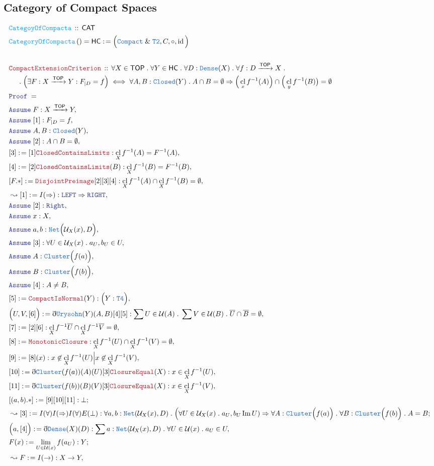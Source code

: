 \documentclass[12pt]{scrartcl}
\newcommand{\TYPE}[1]{\textcolor{NavyBlue}{\mathtt{#1}}}
\newcommand{\FUNC}[1]{\textcolor{Cerulean}{\mathtt{#1}}}
\newcommand{\LOGIC}[1]{\textcolor{Blue}{\mathtt{#1}}}
\newcommand{\THM}[1]{\textcolor{Maroon}{\mathtt{#1}}}
\renewcommand{\.}{\; . \;}
\newcommand{\de}{: \kern 0.1pc =}
\newcommand{\Act}[1]{\left( #1 \right)}
\newcommand{\Theorem}[2]{& \THM{#1} \, :: \, #2 \\ & \Proof = \\ }
\newcommand{\DeclareFunc}[2]{& \FUNC{#1} \, :: \, #2 \\}
\newcommand{\DefineNamedFunc}[4]{&  \FUNC{#1}\Act{#2} = #3 \de #4 \\}
\newcommand{\NewLine}{\\ & \kern 1pc}
\newcommand{\Page}[1]{ \begin{align*} #1 \end{align*}   }
\newcommand{ \bd }{ \ByDef }
\renewcommand{\And}{\; \& \;}
\newcommand{\Imply}{\Rightarrow}
\DeclareMathOperator*{\id}{id}
\DeclareMathOperator*{\im}{Im}
\newcommand{\Arrow}{\xrightarrow}
\newcommand{\Say}[3]{& #1 \de #2 : #3, \\}
\newcommand{\Conclude}[3]{& #1 \de #2 : #3; \\}
\newcommand{\Derive}[3]{& \leadsto #1 \de #2 : #3, \\}
\newcommand{\DeriveConclude}[3]{& \leadsto #1 \de #2 : #3 ; \\}
\newcommand{\Assume}[2]{& \LOGIC{Assume} \; #1 : #2, \\}
\newcommand{\ByDef}{\eth}
\newcommand{\Proof}{\LOGIC{Proof} \; }
\newcommand{\CAT}{\mathsf{CAT}}
\DeclareMathOperator*{\cl}{cl}
\newcommand{\TOP}{\mathsf{TOP}}
\newcommand{\HC}{\mathsf{HC}}
\newcommand{\U}{\mathcal{U}}
\begin{document}
\subsection{Category of Compact Spaces}
\Page{
	\DeclareFunc{CategoyOfCompacta}{\CAT}
	\DefineNamedFunc{CategoryOfCompacta}{}{\HC}{ \Big( \TYPE{Compact} \And \TYPE{T2}, C, \circ, \id \Big)  } 
	\\
	\Theorem{CompactExtensionCriterion}
	{
		\forall X \in \TOP \.
		\forall Y \in \HC \. 
		\forall D : \TYPE{Dense}(X) \.
		\forall f : D \Arrow{\TOP} X \.
		\NewLine \. 
		\Big(\exists F : X \Arrow{\TOP} Y  : F_{|D} = f \Big)    
		\iff
		\forall A,B : \TYPE{Closed}(Y) \.  
		A \cap B= \emptyset \Imply
		\Big(\cl_x f^{-1}(A)\Big) \cap \Big( \cl_y f^{-1}(B) \big) = \emptyset 
	}
	\Assume{F}{X \Arrow{\TOP} Y}
	\Assume{[1]}{F_{|D} = f }
	\Assume{A,B}{\TYPE{Closed}(Y)}
	\Assume{[2]}{A \cap B = \emptyset}
	\Say{[3]}{[1]\THM{ClosedContainsLimits}}{\cl_X f^{-1}(A) = F^{-1}(A) }
	\Say{[4]}{[2]\THM{ClosedContainsLimits}(B)}{\cl_X f^{-1}(B) = F^{-1}(B)}
	\Say{[F.*]}{\THM{DisjointPreimage}[2][3][4]}{ \cl_X f^{-1}(A) \cap \cl_X f^{-1}(B) = \emptyset }
	\Derive{[1]}{I(\Imply)}{\LOGIC{LEFT} \Imply \LOGIC{RIGHT}}
	\Assume{[2]}{\LOGIC{Right}}
	\Assume{x}{X}
	\Assume{a,b}{\TYPE{Net}\Big(\U_X(x),D\Big)}
	\Assume{[3]}{\forall  U \in \U_X(x) \.  a_U,b_U \in U}
	\Assume{A}{\TYPE{Cluster}\Big(f(a)\Big)}
	\Assume{B}{\TYPE{Cluster}\Big( f(b)\Big)}
	\Assume{[4]}{A \neq B}
	\Say{[5]}{\THM{CompactIsNormal}(Y)}{\Big( Y : \TYPE{T4}\Big)}
	\Say{\Big( U,V, [6] \Big)}
	{
		\bd \TYPE{Urysohn}(Y)(A,B)[4][5] 
	}
	{
		\sum U \in \U(A) \. \sum V \in \U(B) \. 
		\overline{U} \cap \overline{B} = \emptyset 
	}
	\Say{[7]}{[2][6]}{\cl_X f^{-1}\overline{U} \cap \cl_X f^{-1}\overline{V} = \emptyset}
	\Say{[8]}{\THM{MonotonicClosure}}{\cl_X f^{-1}(U) \cap \cl_X f^{-1}(V) = \emptyset}
	\Say{[9]}{[8](x)}{x \not \in \cl_X f^{-1}(U) \Big| x \not \in \cl_X f^{-1}(V) }
	\Say{[10]}{\bd \TYPE{Cluster}(f(a))(A)(U)[3]\THM{ClosureEqual}(X)}{x \in \cl_X f^{-1}(U)}
	\Say{[11]}{\bd \TYPE{Cluster}(f(b))(B)(V)[3]\THM{ClosureEqual}(X)}{x \in \cl_X f^{-1}(V)}
	\Conclude{[(a,b).*]}{[9][10][11]}{\bot}
	\DeriveConclude{[3]}{I(\forall)I(\Imply)I(\forall)E(\bot)}
	{
		\forall a,b : \TYPE{Net}(\U_X(x),D) \.
		\Big( \forall U \in \U_X(x) \. a_U,b_U \im U) \Imply 
		\forall A : \TYPE{Cluster}\Big( f(a)\Big) \.
		\forall B : \TYPE{Cluster}\Big( f(b) \Big) \.
		A = B
	}
	\Say{\Big(a,[4]\Big)}{  \bd \TYPE{Dense}(X)(D)}{ \sum a : \TYPE{Net}(\U_X(x),D) \. \forall U \in \U(x) \. a_U \in U   }
	\Conclude{F(x)}{\lim_{U \in \U(x)} f(a_U)}{Y}
	\Derive{F}{I(\to)}{X \to Y}
}
\end{document}
